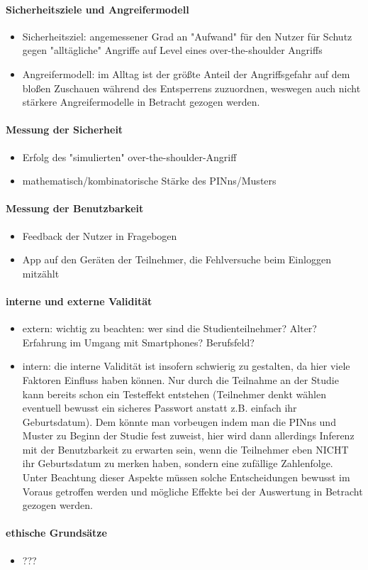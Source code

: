 \paragraph{Sicherheitsziele und Angreifermodell}
\begin{itemize}
\item Sicherheitsziel: angemessener Grad an "Aufwand" für den Nutzer für Schutz gegen "alltägliche" Angriffe auf Level eines over-the-shoulder Angriffs
\item Angreifermodell: im Alltag ist der größte Anteil der Angriffsgefahr auf dem bloßen Zuschauen während des Entsperrens zuzuordnen, weswegen auch nicht stärkere Angreifermodelle in Betracht gezogen werden.
\end{itemize}

\paragraph{Messung der Sicherheit}
\begin{itemize}
\item Erfolg des "simulierten" over-the-shoulder-Angriff
\item mathematisch/kombinatorische Stärke des PINns/Musters
\end{itemize}

\paragraph{Messung der Benutzbarkeit}
\begin{itemize}
\item Feedback der Nutzer in Fragebogen
\item App auf den Geräten der Teilnehmer, die Fehlversuche beim Einloggen mitzählt
\end{itemize}

\paragraph{interne und externe Validität}
\begin{itemize}
\item extern: wichtig zu beachten: wer sind die Studienteilnehmer? Alter? Erfahrung im Umgang mit Smartphones? Berufsfeld?
\item intern: die interne Validität ist insofern schwierig zu gestalten, da hier viele Faktoren Einfluss haben können. Nur durch die Teilnahme an der Studie kann bereits schon ein Testeffekt entstehen (Teilnehmer denkt wählen eventuell bewusst ein sicheres Passwort anstatt z.B. einfach ihr Geburtsdatum). Dem könnte man vorbeugen indem man die PINns und Muster zu Beginn der Studie fest zuweist, hier wird dann allerdings Inferenz mit der Benutzbarkeit zu erwarten sein, wenn die Teilnehmer eben NICHT ihr Geburtsdatum zu merken haben, sondern eine zufällige Zahlenfolge. \\
Unter Beachtung dieser Aspekte müssen solche Entscheidungen bewusst im Voraus getroffen werden und mögliche Effekte bei der Auswertung in Betracht gezogen werden.
\end{itemize}

\paragraph{ethische Grundsätze}
\begin{itemize}
\item ???
\end{itemize}
